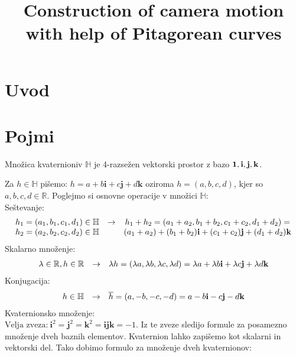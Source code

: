 \documentclass[mat1]{fmfdelo}
\title{Construction of camera motion with help of Pitagorean curves}
\newcommand{\R}{\mathbb R}
\newcommand{\HH}{\mathbb H}
\begin{document}
\section{Uvod}
\section{Pojmi}

\begin{definicija}
Množica kvaternioniv $\HH$ je 4-razsežen vektorski prostor z bazo $\bf{1},\bf{i},\bf{j},\bf{k}$.
\end{definicija}
Za $h\in \HH$ pišemo: $h = a + b\mathbf{i} + c\mathbf{j} + d\mathbf{k}$ oziroma $h=(a,b,c,d)$, kjer so $a,b,c,d\in \R$.
Poglejmo si osnovne operacije v množici $\HH$:\\
Seštevanje:
\begin{equation*}
\begin{array}{c c c}
h_1 = (a_1,b_1,c_1,d_1) \in \HH &  \rightarrow & h_1 + h_2 = (a_1+a_2,b_1+b_2,c_1+c_2,d_1+d_2) = \\
h_2 = (a_2,b_2,c_2,d_2) \in \HH &  & (a_1+a_2) + (b_1+b_2)\mathbf{i} + (c_1+c_2)\mathbf{j} + (d_1+d_2)\mathbf{k}
\end{array}
\end{equation*}
Skalarno množenje:
\begin{equation*}
\begin{array}{c c c}
\lambda \in \R, h \in \R & \rightarrow & \lambda h = (\lambda a, \lambda b, \lambda c, \lambda d) =  \lambda a + \lambda b \mathbf{i} + \lambda c \mathbf{j} + \lambda d \mathbf{k}
\end{array}
\end{equation*}
Konjugacija:
\begin{equation*}
\begin{array}{c c c}
h \in \HH & \rightarrow &\overline{h} = (a,-b,-c,-d)= a-b\mathbf{i} - c\mathbf{j} - d\mathbf{k}
\end{array}
\end{equation*}
Kvaternionsko množenje:\\
$\text{Velja zveza:}~\mathbf{i}^2 = \mathbf{j}^2 = \mathbf{k}^2 = \mathbf{ijk} = -1$. Iz te zveze sledijo formule za posamezno množenje dveh baznih elementov. Kvaternion lahko zapišemo kot skalarni in vektorski del. Tako dobimo formulo za množenje dveh kvaternionov:
\end{document}
